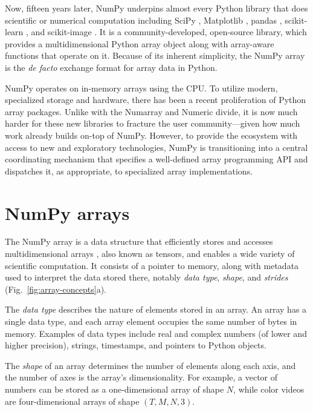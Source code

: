 Now, fifteen years later, NumPy underpins almost every Python library that does scientific or
numerical computation including SciPy \cite{virtanen2020scipy},
Matplotlib \cite{hunter2007matplotlib}, pandas \cite{mckinney-proc-scipy-2010},
scikit-learn \cite{pedregosa2011scikit}, and
scikit-image \cite{vanderwalt2014scikit}.
It is a community-developed, open-source library, which provides a
multidimensional Python array object along with array-aware functions
that operate on it.
Because of its inherent simplicity, the NumPy array is
the \emph{de facto} exchange format for array data in Python.

NumPy operates on in-memory arrays using the CPU. To utilize modern,
specialized storage and hardware, there has been a recent
proliferation of Python array packages. Unlike with the Numarray and
Numeric divide, it is now much harder for these new libraries to
fracture the user community---given how much work already builds
on-top of NumPy.  However, to provide the ecosystem with access to
new and exploratory technologies, NumPy is transitioning into a
central coordinating mechanism that specifies a well-defined array
programming API and
dispatches it, as appropriate, to specialized array implementations.

\section*{NumPy arrays}

The NumPy array is a data structure that efficiently stores and accesses
multidimensional arrays \cite{vanderwalt2011numpy}, also known as tensors, and
enables a wide variety of scientific computation.
It consists of a pointer to memory, along with metadata used to interpret the
data stored there, notably {\em data type}, {\em shape}, and {\em strides}
(Fig.~\ref{fig:array-concepts}a).

The \emph{data type} describes the nature of elements stored in an array.
An array has a single data type, and each array element occupies the same
number of bytes in memory.
Examples of data types include real and complex numbers (of lower and higher
precision), strings, timestamps, and pointers to Python objects.

The \emph{shape} of an array determines the number of elements along each axis,
and the number of axes is the array's dimensionality.
For example, a vector of numbers can be stored as a one-dimensional array of
shape $N$, while color videos are four-dimensional arrays of shape
$(T, M, N, 3)$.

